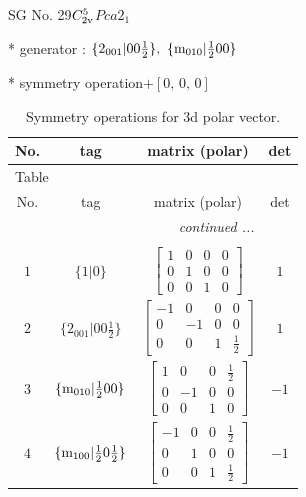 \documentclass[fleqn,8pt]{jsarticle}
\begin{document}
\setcounter{MaxMatrixCols}{32}

\renewcommand{\tablename}{Table~}
\renewcommand{\figurename}{Figure~}
\begin{center}
\LARGE
SG No. 29\quad$C_{\rm 2v}^{5}$\quad$Pca2_1$\quad[ orthorhombic ]
\end{center}

* generator : $\{2{}_{001}|0 0 \frac{1}{2}\},\,\,\{{\rm m}_{010}|\frac{1}{2} 0 0\}$

* symmetry operation\quad$+\left[ 0,\, 0,\, 0 \right]$
\renewcommand{\arraystretch}{1.3}
\begin{longtable}{cccc}
\caption{Symmetry operations for 3d polar vector.}
 \\
 \hline \hline
No. & tag & matrix (polar) & det \\ \hline \endfirsthead

\multicolumn{3}{l}{\tablename\ \thetable{}} \\
 \hline \hline
No. & tag & matrix (polar) & det \\ \hline \endhead

 \hline \hline
\multicolumn{3}{r}{\footnotesize\it continued ...} \\ \endfoot

 \hline \hline
\multicolumn{3}{r}{} \\ \endlastfoot

$ 1 $ & $ \{1|0\} $ & $ \begin{bmatrix} 1 & 0 & 0 & 0 \\ 0 & 1 & 0 & 0 \\ 0 & 0 & 1 & 0 \end{bmatrix} $ & $ 1 $ \\ \hline
$ 2 $ & $ \{2{}_{001}|0 0 \frac{1}{2}\} $ & $ \begin{bmatrix} -1 & 0 & 0 & 0 \\ 0 & -1 & 0 & 0 \\ 0 & 0 & 1 & \frac{1}{2} \end{bmatrix} $ & $ 1 $ \\ \hline
$ 3 $ & $ \{{\rm m}_{010}|\frac{1}{2} 0 0\} $ & $ \begin{bmatrix} 1 & 0 & 0 & \frac{1}{2} \\ 0 & -1 & 0 & 0 \\ 0 & 0 & 1 & 0 \end{bmatrix} $ & $ -1 $ \\ \hline
$ 4 $ & $ \{{\rm m}_{100}|\frac{1}{2} 0 \frac{1}{2}\} $ & $ \begin{bmatrix} -1 & 0 & 0 & \frac{1}{2} \\ 0 & 1 & 0 & 0 \\ 0 & 0 & 1 & \frac{1}{2} \end{bmatrix} $ & $ -1 $ \\
\end{longtable}
\end{document}
